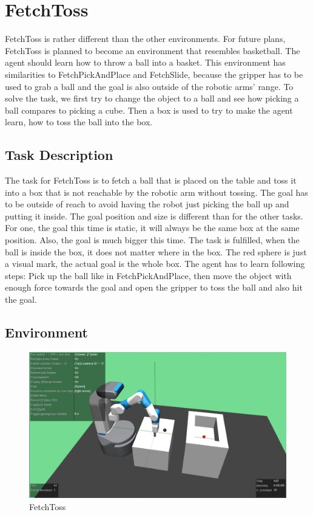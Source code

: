 \section{FetchToss}

FetchToss is rather different than the other environments. For future plans, FetchToss is planned to become an environment that resembles basketball. The agent should learn how to throw a ball into a basket. This environment has similarities to FetchPickAndPlace and FetchSlide, because the gripper has to be used to grab a ball and the goal is also outside of the robotic arms' range. To solve the task, we first try to change the object to a ball and see how picking a ball compares to picking a cube.
Then a box is used to try to make the agent learn, how to toss the ball into the box.

\subsection{Task Description}

The task for FetchToss is to fetch a ball that is placed on the table and toss it into a box that is not reachable by the robotic arm without tossing. The goal has to be outside of reach to avoid having the robot just picking the ball up and putting it inside. The goal position and size is different than for the other tasks. For one, the goal this time is static, it will always be the same box at the same position. Also, the goal is much bigger this time. The task is fulfilled, when the ball is inside the box, it does not matter where in the box. The red sphere is just a visual mark, the actual goal is the whole box. The agent has to learn following steps: Pick up the ball like in FetchPickAndPlace, then move the object with enough force towards the goal and open the gripper to toss the ball and also hit the goal.


\subsection{Environment}

\begin{figure} [ht]
	
	\centering
	\includegraphics[width=1\textwidth]{figures/FetchToss-v1.pdf}
	\caption{FetchToss}
	\label{toss1}
\end{figure}

